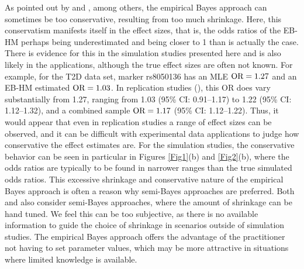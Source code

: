 As pointed out by
\citet{Duditetal02}
and
\citet{rma2003},
among others, the empirical Bayes approach can sometimes be too
conservative, resulting from too much shrinkage. Here, this
conservatism manifests itself in the effect sizes, that is,
the odds ratios of the EB-HM perhaps being underestimated and
being closer to 1 than is actually the case. There is evidence
for this in the simulation studies presented here and is
also likely in the
\citet{LW2004}
applications, although the true effect sizes are often
not known. For example, for the T2D data set, marker
rs8050136 has an MLE $\hbox{OR} = 1.27$ and an EB-HM estimated
$\hbox{OR} = 1.03$. In replication studies
(\citealp{rieger2004}),
this OR does vary substantially from 1.27, ranging from
1.03 (95\% CI: 0.91--1.17) to
1.22 (95\% CI: 1.12--1.32), and a combined sample
$\hbox{OR} = 1.17$ (95\% CI: 1.12--1.22). Thus, it would
appear that even in replication studies a range of effect
sizes can be observed, and it can be difficult with
experimental data applications to judge how conservative
the effect estimates are. For the simulation studies, the
conservative behavior can be seen in particular in
Figures \ref{Fig1}(b) and \ref{Fig2}(b), where the odds
ratios are typically to be found in narrower ranges than
the true simulated odds ratios. This excessive shrinkage
and conservative nature of the empirical Bayes approach
is often a reason why semi-Bayes approaches are preferred.
Both
\citet{tomlins2005}
and
\citet{TTC01}
also consider semi-Bayes approaches, where the amount of
shrinkage can be hand tuned. We feel this can be too
subjective, as there is no available information to guide
the choice of shrinkage in scenarios outside of simulation
studies. The empirical Bayes approach offers the advantage
of the practitioner not having to set parameter values,
which may be more attractive in situations where limited
knowledge is available.

